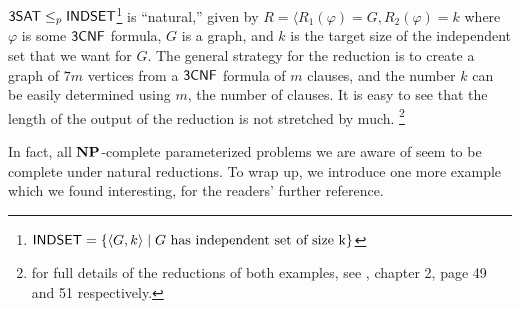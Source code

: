 \documentclass[11pt]{article}
\begin{document}
\begin{example}
	$\mathsf{3SAT} \leq_p \mathsf{INDSET}$\footnote{$\mathsf{INDSET} = \{ \langle G, k \rangle \mid G \text{ has independent set of size k}\}$} is ``natural,'' given by $R = \langle R_1(\varphi) = G, R_2(\varphi) = k$ where $\varphi$ is some $\mathsf{3CNF}$ formula, $G$ is a graph, and $k$ is the target size of the independent set that we want for $G$. The general strategy for the reduction is to create a graph of $7m$ vertices from a $\mathsf{3CNF}$ formula of $m$ clauses, and the number $k$ can be easily determined using $m$, the number of clauses. It is easy to see that the length of the output of the reduction is not stretched by much. \footnote{for full details of the reductions of both examples, see \cite{arora2009}, chapter 2, page 49 and 51 respectively.}
\end{example}
	
In fact, all $\mathbf{NP}$-complete parameterized problems we are aware of seem to be complete under natural reductions. To wrap up, we introduce one more example which we found interesting, for the readers' further reference.
\end{document}
